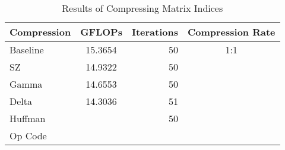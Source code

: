 \begin{table}
	\centering
	\begin{tabular}{l|S|r|c}
		Compression & GFLOPs & Iterations & Compression Rate\\
		\hline
		Baseline & 15.3654 & 50 & 1:1 \\
		SZ & 14.9322 & 50 & \\
		Gamma & 14.6553 & 50 & \\ %
		Delta & 14.3036 & 51 & \\
		Huffman & & 50 & \\
		Op Code & & & \\
	\end{tabular}
	\caption{Results of Compressing Matrix Indices}
	\label{tab:results-ind}
\end{table}
